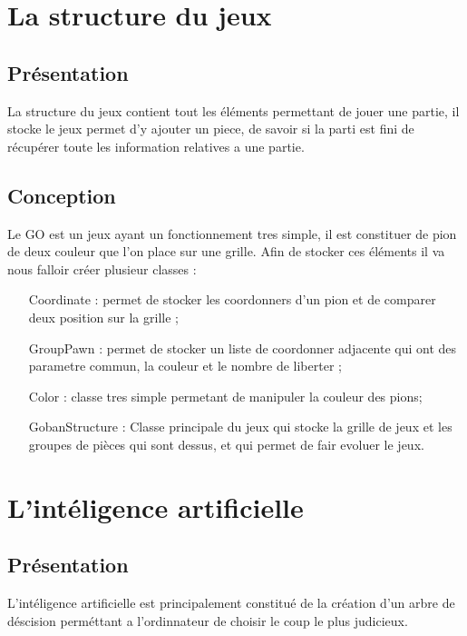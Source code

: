 \documentclass[12pt,a4paper,utf8x]{report}
\begin{document}
\begin{onehalfspace}
\section{La structure du jeux}

	\subsection{Présentation}
	
		La structure du jeux contient tout les éléments permettant de jouer une partie, il stocke le jeux permet d'y ajouter un piece, de savoir si la parti est fini
		de récupérer toute les information relatives a une partie.
		
	\subsection{Conception}
	
		Le GO est un jeux ayant un fonctionnement tres simple, il est constituer de pion de deux couleur que l'on place sur une grille. Afin de stocker ces éléments
		il va nous falloir créer plusieur classes : 
			\begin{itemize}
				\item[Coordinate] : permet de stocker les coordonners d'un pion et de comparer deux position sur la grille ;
				\item[GroupPawn] : permet de stocker un liste de coordonner adjacente qui ont des parametre commun, la couleur et le nombre de liberter ;
				\item[Color] : classe tres simple permetant de manipuler la couleur des pions;
				\item[GobanStructure] : Classe principale du jeux qui stocke la grille de jeux et les groupes de pièces qui sont dessus, et qui permet de fair evoluer le jeux.
			\end{itemize}

\section{L'intéligence artificielle}

	\subsection{Présentation}
	
		L'intéligence artificielle est principalement constitué de la création d'un arbre de déscision perméttant a l'ordinnateur de choisir le coup le plus judicieux.
	

\end{onehalfspace}
\end{document}
